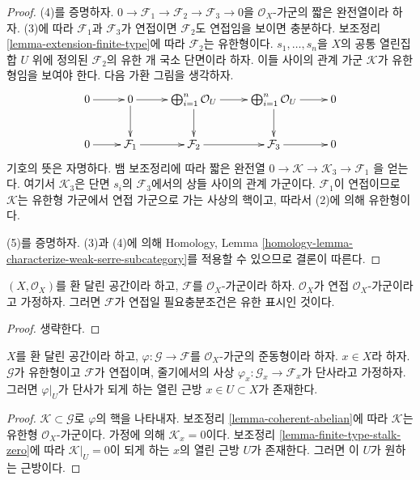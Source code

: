 \begin{proof}
\medskip\noindent
(4)를 증명하자.
$0 \to \mathcal{F}_1 \to \mathcal{F}_2 \to \mathcal{F}_3 \to 0$을
$\mathcal{O}_X$-가군의 짧은 완전열이라 하자.
(3)에 따라 $\mathcal{F}_1$과 $\mathcal{F}_3$가 연접이면
$\mathcal{F}_2$도 연접임을 보이면 충분하다.
보조정리 \ref{lemma-extension-finite-type}에 따라
$\mathcal{F}_2$는 유한형이다. $s_1, \ldots, s_n$을
$X$의 공통 열린집합 $U$ 위에 정의된 $\mathcal{F}_2$의 유한 개 국소 단면이라 하자.
이들 사이의 관계 가군 $\mathcal{K}$가 유한형임을 보여야 한다.
다음 가환 그림을 생각하자.
$$
\xymatrix{
0 \ar[r] &
0 \ar[r] \ar[d] &
\bigoplus_{i = 1}^{n} \mathcal{O}_U \ar[r] \ar[d] &
\bigoplus_{i = 1}^{n} \mathcal{O}_U \ar[r] \ar[d] &
0 \\
0 \ar[r] &
\mathcal{F}_1 \ar[r] &
\mathcal{F}_2 \ar[r] &
\mathcal{F}_3 \ar[r] &
0
}
$$
기호의 뜻은 자명하다. 뱀 보조정리에 따라 짧은 완전열
$0 \to \mathcal{K} \to \mathcal{K}_3 \to \mathcal{F}_1$
을 얻는다. 여기서 $\mathcal{K}_3$은 단면 $s_i$의 $\mathcal{F}_3$에서의
상들 사이의 관계 가군이다. $\mathcal{F}_1$이 연접이므로
$\mathcal{K}$는 유한형 가군에서 연접 가군으로 가는 사상의 핵이고,
따라서 (2)에 의해 유한형이다.

\medskip\noindent
(5)를 증명하자. (3)과 (4)에 의해 Homology, Lemma
\ref{homology-lemma-characterize-weak-serre-subcategory}를 적용할 수 있으므로
결론이 따른다.
\end{proof}

\begin{lemma}
\label{lemma-coherent-structure-sheaf}
$(X, \mathcal{O}_X)$를 환 달린 공간이라 하고,
$\mathcal{F}$를 $\mathcal{O}_X$-가군이라 하자.
$\mathcal{O}_X$가 연접 $\mathcal{O}_X$-가군이라고 가정하자.
그러면 $\mathcal{F}$가 연접일 필요충분조건은 유한 표시인 것이다.
\end{lemma}

\begin{proof}
생략한다.
\end{proof}

\begin{lemma}
\label{lemma-finite-type-to-coherent-injective-on-stalk}
$X$를 환 달린 공간이라 하고,
$\varphi : \mathcal{G} \to \mathcal{F}$를 $\mathcal{O}_X$-가군의
준동형이라 하자. $x \in X$라 하자.
$\mathcal{G}$가 유한형이고 $\mathcal{F}$가 연접이며, 줄기에서의 사상
$\varphi_x : \mathcal{G}_x \to \mathcal{F}_x$가 단사라고 가정하자.
그러면 $\varphi|_U$가 단사가 되게 하는 열린 근방
$x \in U \subset X$가 존재한다.
\end{lemma}

\begin{proof}
$\mathcal{K} \subset \mathcal{G}$로 $\varphi$의 핵을 나타내자.
보조정리 \ref{lemma-coherent-abelian}에 따라 $\mathcal{K}$는
유한형 $\mathcal{O}_X$-가군이다. 가정에 의해 $\mathcal{K}_x = 0$이다.
보조정리 \ref{lemma-finite-type-stalk-zero}에 따라
$\mathcal{K}|_U = 0$이 되게 하는 $x$의 열린 근방 $U$가 존재한다.
그러면 이 $U$가 원하는 근방이다.
\end{proof}













